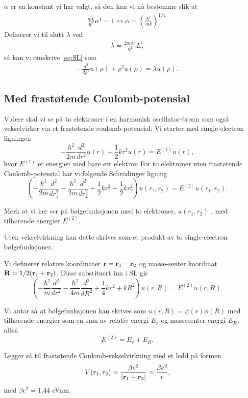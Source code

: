 \documentclass[11pt]{article}
\begin{document}
$\alpha$ er en konstant vi har valgt, så den kan vi nå bestemme slik
at 
\begin{align*}
  \frac{ mk }{ \hbar^2 }\alpha^4 = 1 \Leftrightarrow \alpha = \left(\frac{ \hbar^2 }{ mk }\right)^{1/4}.
\end{align*}
Definerer vi til slutt $\lambda$ ved
\begin{align*}
  \lambda = \frac{ 2m\alpha^2 }{ \hbar^2 }E,
\end{align*}
så kan vi omskrive \eqref{eq:SL} som
\begin{align}
  -\frac{ d^2 }{ d\rho^2 }u(\rho) + \rho^2u(\rho) = \lambda u(\rho).\label{eq:SL-rewrite}
\end{align}

\subsection{Med frastøtende Coulomb-potensial}

Videre skal vi se på to elektroner i en harmonisk oscillator-brønn som også 
vekselvirker via et frastøtende coulomb-potensial.
Vi starter med single-electron ligningen
\[
  -\frac{\hbar^2}{2 m} \frac{d^2}{dr^2} u(r) 
       + \frac{1}{2}k r^2u(r)  = E^{(1)} u(r),
\]
hvor $E^{(1)}$ er energien med bare ett elektron
For to elektroner uten frastøtende Coulomb-potensial har vi
følgende Schr\"odinger ligning
\[
\left(  -\frac{\hbar^2}{2 m} \frac{d^2}{dr_1^2} -\frac{\hbar^2}{2 m} \frac{d^2}{dr_2^2}+ \frac{1}{2}k r_1^2+ \frac{1}{2}k r_2^2\right)u(r_1,r_2)  = E^{(2)} u(r_1,r_2) .
\]

Merk at vi her ser på bølgefunksjonen med to elektroner, $u(r_1,r_2)$
, med tilhørende energier $E^{(2)}$.

Uten vekselvirkning kan dette skrives som et produkt av to single-electron
bølgefunksjoner.

Vi definerer relative koordinater ${\bf r} = {\bf r}_1-{\bf r}_2$
og masse-senter koordinat ${\bf R} = 1/2({\bf r}_1+{\bf r}_2)$.
Disse substituert inn i SL gir
\[
\left(  -\frac{\hbar^2}{m} \frac{d^2}{dr^2} -\frac{\hbar^2}{4 m} \frac{d^2}{dR^2}+ \frac{1}{4} k r^2+  kR^2\right)u(r,R)  = E^{(2)} u(r,R).
\]


Vi antar så at bølgefunksjonen kan skrives som $u(r,R) = \psi(r)\phi(R)$ med 
tilhørende energier som en sum av relativ energi $E_r$ og massesenter-energi $E_R$, altså
\[
E^{(2)}=E_r+E_R.
\]

Legger så til frastøtende Coulomb-vekselvirkning med et ledd på formen
\[
V(r_1,r_2) = \frac{\beta e^2}{|{\bf r}_1-{\bf r}_2|}=\frac{\beta e^2}{r},
\]
med $\beta e^2=1.44$ eVnm.
\end{document}
